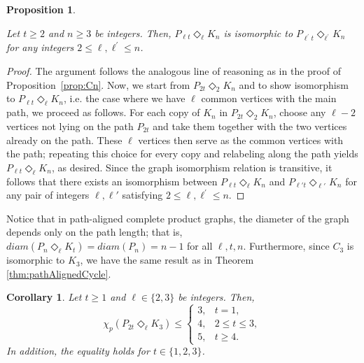 \documentclass{article}
\newtheorem{prop}[theorem]{Proposition}
\newtheorem{corollary}{Corollary}
\begin{document}
\begin{prop}\label{prop:Kn}

    Let $t \ge 2$ and $n \ge 3$ be integers. Then, $P_{\ell t}\Diamond_{\ell} K_n$ is isomorphic to $P_{\ell^{'}t}\Diamond_{\ell^{'}} K_n$ for any integers $2 \leq \ell, \ell^{'} \le n$.
\end{prop}
\begin{proof}

 The argument follows the analogous line of reasoning as in the proof of Proposition~\ref{prop:Cn}. Now, we start from $P_{2t}\Diamond_{2} K_n$ and to show isomorphism to $P_{\ell t}\Diamond_\ell K_n$, i.e. the case where we have $\ell$ common vertices with the main path, we proceed as follows. For each copy of $K_n$ in $P_{2t}\Diamond_{2} K_n$, choose any $\ell -2$ vertices not lying on the path $P_{2t}$ and take them together with the two vertices already on the path. These $\ell$ vertices then serve as the common vertices with the path; repeating this choice for every copy and relabeling along the path yields $P_{\ell t}\Diamond_\ell K_n$, as desired. Since the graph isomorphism relation is transitive, it follows that there exists an isomorphism between $P_{\ell t}\Diamond_{\ell} K_n$ and $P_{\ell ' t}\Diamond_{\ell'} K_n$ for any pair of integers $\ell, \ell '$ satisfying $2 \leq \ell, \ell^{'} \le n$.
\end{proof}


Notice that in path-aligned complete product graphs, the diameter of the graph depends only on the path length; that is, $diam(P_n\Diamond_{\ell}K_t)=diam(P_n) = n - 1$ for all $\ell, t, n$. Furthermore, since $C_3$ is isomorphic to $K_3$, we have the same result as in Theorem \ref{thm:pathAlignedCycle}.

\begin{corollary}\label{cor:K_3}
Let $t\geq 1$ and $\ell \in \{2,3\}$ be integers. Then,     $$\chi_p(P_{2t}\Diamond_{\ell} K_3)\leq\left\{
\begin{array}{ll}
3, & t=1,\\
4, & 2 \leq t \leq 3,\\
5, & t\geq 4.
\end{array}\right.
$$
In addition, the equality holds for $t\in\{1,2,3\}$.     
\end{corollary} 
\end{document}
